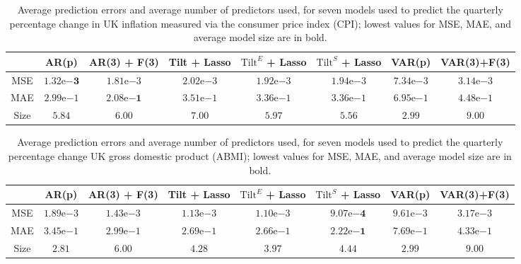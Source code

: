 \documentclass[11pt]{report}\usepackage[utf8]{inputenc}
\begin{document}
\newpage
\begin{landscape}

\begin{table}
    \centering
    \begin{tabular}{|c||c|c|c|c|c|c|c|}
    \cmidrule(r){1-8}
     & AR(p) & AR(3) + F(3) & Tilt + Lasso & $\text{Tilt}^{E}$ + Lasso & $\text{Tilt}^{S}$ + Lasso & VAR(p) & VAR(3)+F(3) \\
     \hline
     MSE & $\boldsymbol{1.32\mathrm{e}{-3}}$ & $1.81\mathrm{e}{-3}$ & $2.02\mathrm{e}{-3}$ & $1.92\mathrm{e}{-3}$ & $1.94\mathrm{e}{-3}$ & $7.34\mathrm{e}{-3}$ & $3.14\mathrm{e}{-3}$ \\
     MAE & $2.99\mathrm{e}{-1}$ & $\boldsymbol{2.08\mathrm{e}{-1}}$ & $3.51\mathrm{e}{-1}$ & $3.36\mathrm{e}{-1}$ & $3.36\mathrm{e}{-1}$ & $6.95\mathrm{e}{-1}$ & $4.48\mathrm{e}{-1}$ \\
     Size & $5.84$ & $6.00$ & $7.00$ & $5.97$ & $5.56$ & $\boldsymbol{2.99}$ & $9.00$\\
    \hline
    \end{tabular}
    \caption{Average prediction errors and average number of predictors used, for seven models used to predict the quarterly percentage change in UK inflation measured via the consumer price index (CPI); lowest values for MSE, MAE, and average model size are in bold.}
    \label{CPI table}
\end{table}

\begin{table}
    \centering
    \begin{tabular}{|c||c|c|c|c|c|c|c|}
    \cmidrule(r){1-8}
     & AR(p) & AR(3) + F(3) & Tilt + Lasso & $\text{Tilt}^{E}$ + Lasso & $\text{Tilt}^{S}$ + Lasso & VAR(p) & VAR(3)+F(3) \\
     \hline
     MSE & $1.89\mathrm{e}{-3}$ & $1.43\mathrm{e}{-3}$ & $1.13\mathrm{e}{-3}$ & $1.10\mathrm{e}{-3}$ & $\boldsymbol{9.07\mathrm{e}{-4}}$ & $9.61\mathrm{e}{-3}$ & $3.17\mathrm{e}{-3}$ \\
     MAE & $3.45\mathrm{e}{-1}$ & $2.99\mathrm{e}{-1}$ & $2.69\mathrm{e}{-1}$ & $2.66\mathrm{e}{-1}$ & $\boldsymbol{2.22\mathrm{e}{-1}}$ & $7.69\mathrm{e}{-1}$ & $4.33\mathrm{e}{-1}$ \\
     Size & $\boldsymbol{2.81}$ & $6.00$ & $4.28$ & $3.97$ & $4.44$ & $2.99$ & $9.00$\\
    \hline
    \end{tabular}
    \caption{Average prediction errors and average number of predictors used, for seven models used to predict the quarterly percentage change UK gross domestic product (ABMI); lowest values for MSE, MAE, and average model size are in bold.}
    \label{GDP table}
\end{table}


\end{landscape}
\end{document}
